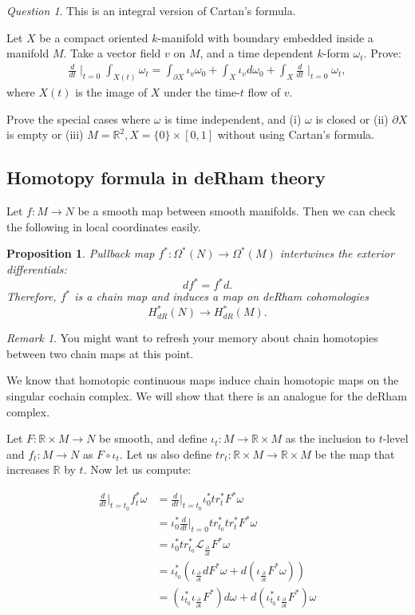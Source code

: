 \documentclass[12pt]{amsart}
\newtheorem{proposition}{Proposition}
\theoremstyle{remark}
\newtheorem{remark}{Remark}
\newtheorem{question}{Question}
\begin{document}
\begin{question}\label{qintegralcartan}This is an integral version of Cartan's formula.

Let $X$ be a compact oriented $k$-manifold with boundary embedded inside a manifold $M$. Take a vector field $v$ on $M$, and a time dependent $k$-form $\omega_t$. Prove: \begin{align*}
\frac{d}{dt}\mid_{t=0}\int_{X(t)}\omega_t=\int_{\partial X}\iota_v\omega_0+\int_X \iota_vd\omega_0+\int_X \frac{d}{dt}\mid_{t=0}\omega_t,
\end{align*} where $X(t)$ is the image of $X$ under the time-$t$ flow of $v$.

Prove the special cases where $\omega$ is time independent, and (i) $\omega$ is closed or (ii) $\partial X$ is empty or (iii) $M=\mathbb{R}^2, X=\{0\}\times [0,1]$ without using Cartan's formula. 
\end{question}


\subsection{Homotopy formula in deRham theory}
Let $f: M\to N$ be a smooth map between smooth manifolds. Then we can check the following in local coordinates easily.

\begin{proposition}
Pullback map $f^*:\Omega^*(N)\to \Omega^*(M)$ intertwines the exterior differentials: $$df^*=f^*d.$$ Therefore, $f^*$ is a chain map and induces a map on deRham cohomologies $$H^*_{dR}(N)\to H^*_{dR}(M).$$
\end{proposition}

\begin{remark} You might want to refresh your memory about chain homotopies between two chain maps at this point.\end{remark}



We know that homotopic continuous maps induce chain homotopic maps on the singular cochain complex. We will show that there is an analogue for the deRham complex.

Let $F:\mathbb{R}\times M\to N$ be smooth, and define $\iota_t:M\to \mathbb{R}\times M$ as the inclusion to $t$-level and $f_t:M\to N$ as $F\circ\iota_t$. Let us also define  $tr_t:\mathbb{R}\times M\to \mathbb{R}\times M$ be the map that increases $\mathbb{R}$ by $t$. Now let us compute:

\begin{align*}
\frac{d}{dt}|_{t=t_0}f_t^*\omega&=\frac{d}{dt}|_{t=t_0}\iota_0^*tr_{t}^*F^*\omega\\
&=\iota_0^*\frac{d}{dt}|_{t=0}tr_{t_0}^*tr_{t}^*F^*\omega\\&=\iota_0^*tr_{t_0}^*\mathcal{L}_{\frac{\partial}{\partial t}}F^*\omega\\&=\iota_{t_0}^*(\iota_{\frac{\partial}{\partial t}}dF^*\omega+d(\iota_{\frac{\partial}{\partial t}}F^*\omega))\\&=(\iota_{t_0}^*\iota_{\frac{\partial}{\partial t}}F^*)d\omega+d(\iota_{t_0}^*\iota_{\frac{\partial}{\partial t}}F^*)\omega
\end{align*}
\end{document}
